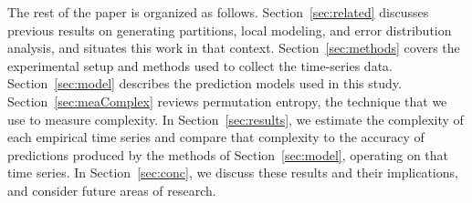 

The rest of the paper is organized as follows.
Section~\ref{sec:related} discusses previous results on generating
partitions, local modeling, and error distribution analysis, and
situates this work in that context. Section~\ref{sec:methods} covers
the experimental setup and methods used to collect the time-series
data. Section~\ref{sec:model} describes the prediction models used in
this study.  Section~\ref{sec:meaComplex} reviews permutation entropy,
the technique that we use to measure complexity.  In
Section~\ref{sec:results}, we estimate the complexity of each
empirical time series and compare that complexity to the accuracy of
predictions produced by the methods of Section~\ref{sec:model},
operating on that time series.  In Section~\ref{sec:conc}, we discuss
these results and their implications, and consider future areas of
research.


